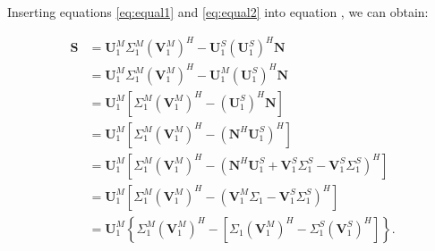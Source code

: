 Inserting equations \ref{eq:equal1} and \ref{eq:equal2} into equation \dlo{\ref{eq:tsvd22}}\wen{\ref{eq:tsvd222}}, we can obtain:

\begin{equation}
\label{eq:S22}
\begin{split}
\mathbf{S} &= \mathbf{U}_1^M\Sigma_1^M(\mathbf{V}_1^M)^H - \mathbf{U}_1^S\left(\mathbf{U}_1^S\right)^H\mathbf{N}\\
 &= \mathbf{U}_1^M\Sigma_1^M(\mathbf{V}_1^M)^H - \mathbf{U}_1^M\left(\mathbf{U}_1^S\right)^H\mathbf{N}\\
&=\mathbf{U}_1^M\left[\Sigma_1^M(\mathbf{V}_1^M)^H-  (\mathbf{U}_1^S)^H\mathbf{N}\right]\\
&=\mathbf{U}_1^M\left[\Sigma_1^M(\mathbf{V}_1^M)^H-  (\mathbf{N}^H\mathbf{U}_1^S)^H\right]\\
&=\mathbf{U}_1^M\left[\Sigma_1^M(\mathbf{V}_1^M)^H-  (\mathbf{N}^H\mathbf{U}_1^S+\mathbf{V}_1^S\Sigma_1^S-\mathbf{V}_1^S\Sigma_1^S)^H\right]\\
&=\mathbf{U}_1^M\left[\Sigma_1^M(\mathbf{V}_1^M)^H- (\mathbf{V}_1^M\Sigma_1-\mathbf{V}_1^S\Sigma_1^S)^H\right]\\
&=\mathbf{U}_1^M\left\{\Sigma_1^M(\mathbf{V}_1^M)^H- \left[\Sigma_1(\mathbf{V}_1^M)^H-\Sigma_1^S(\mathbf{V}_1^S)^H\right]\right\}.
\end{split}
\end{equation}








